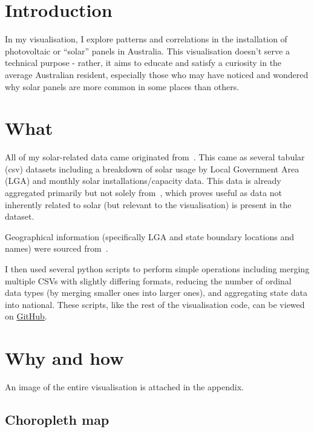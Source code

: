 \documentclass[12pt,letterpaper]{article}
\begin{document}
\begin{multicols}{2}


    \section*{Introduction}

    In my visualisation, I explore patterns and correlations in the installation of photovoltaic or ``solar'' panels in Australia. This visualisation doesn't serve a technical purpose - rather, it aims to educate and satisfy a curiosity in the average Australian resident, especially those who may have noticed and wondered why solar panels are more common in some places than others.

    \section*{What}

    All of my solar-related data came originated from~\citep{noauthor_australian_2022}. This came as several tabular (csv) datasets including a breakdown of solar usage by Local Government Area (LGA) and monthly solar installations/capacity data. This data is already aggregated primarily but not solely from~\citep{noauthor_postcode_2022}, which proves useful as data not inherently related to solar (but relevant to the visualisation) is present in the dataset.

    Geographical information (specifically LGA and state boundary locations and names) were sourced from~\citep{noauthor_digital_nodate}.

    I then used several python scripts to perform simple operations including merging multiple CSVs with slightly differing formats, reducing the number of ordinal data types (by merging smaller ones into larger ones), and aggregating state data into national. These scripts, like the rest of the visualisation code, can be viewed on \href{https://github.com/hallgchris/fit3179-dv2}{GitHub}.

    \section*{Why and how}

    An image of the entire visualisation is attached in the appendix.

    \subsection*{Choropleth map}


\end{multicols}
\end{document}
